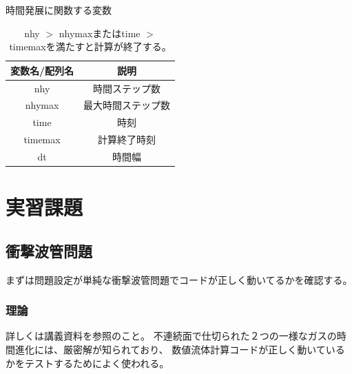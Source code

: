 \begin{table}[h]
\begin{center}
\caption{時間発展に関数する変数}
\begin{tabular}{|c|c|}
    \hline
    変数名/配列名 & 説明 \\
    \hline
    \hline
    {\ttfamily nhy} & 時間ステップ数 \\
    \hline
    {\ttfamily nhymax} & 最大時間ステップ数 \\
    \hline
    {\ttfamily time } & 時刻 \\
    \hline
    {\ttfamily timemax } & 計算終了時刻 \\
    \hline
    {\ttfamily dt} & 時間幅 \\
    \hline
\end{tabular}
\end{center}
\caption{ {\ttfamily nhy $>$ nhymax}または{\ttfamily time $>$ timemax}を満たすと計算が終了する。}
\end{table}

\clearpage
\section{実習課題}

\subsection{衝撃波管問題}
まずは問題設定が単純な衝撃波管問題でコードが正しく動いてるかを確認する。

\subsubsection{理論}

詳しくは講義資料を参照のこと。
不連続面で仕切られた２つの一様なガスの時間進化には、厳密解が知られており、
数値流体計算コードが正しく動いているかをテストするためによく使われる。

